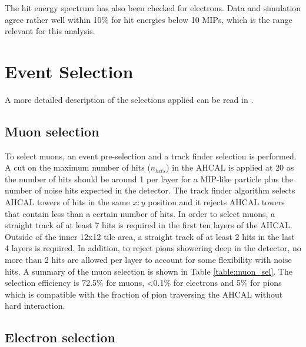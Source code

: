\documentclass{JINST}
\begin{document}
The hit energy spectrum has also been checked for electrons. Data and simulation agree rather well within 10\% for hit energies below 10 MIPs, which is the range relevant for this analysis.

\section{Event Selection}

A more detailed description of the selections applied can be read in \cite{Brianne:2018rur}.

\subsection{Muon selection}

To select muons, an event pre-selection and a track finder \cite{Hartbrich:2016bbz} selection is performed. A cut on the maximum number of hits ($n_{hits}$) in the AHCAL is applied at 20 as the number of hits should be around 1 per layer for a MIP-like particle plus the number of noise hits expected in the detector.
The track finder algorithm selects AHCAL towers of hits in the same $x:y$ position and it rejects AHCAL towers that contain less than a certain number of hits. In order to select muons, a straight track of at least 7 hits is required in the first ten layers of the AHCAL. Outside of the inner 12x12 tile area, a straight track of at least 2 hits in the last 4 layers is required. In addition, to reject pions showering deep in the detector, no more than 2 hits are allowed per layer to account for some flexibility with noise hits. A summary of the muon selection is shown in Table \ref{table:muon_sel}. The selection efficiency is 72.5\% for muons, <0.1\% for electrons and 5\% for pions which is compatible with the fraction of pion traversing the AHCAL without hard interaction.

\subsection{Electron selection}
\end{document}
